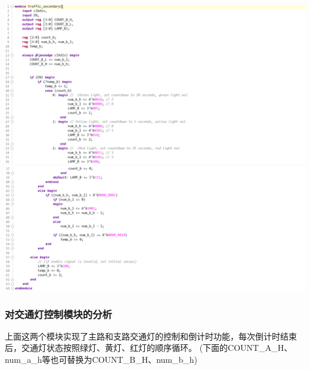 \documentclass[a4,10pt,zihao=-4]{ctexart}
\begin{document}
\vspace{1em}
\noindent\includegraphics[width=1\textwidth]{traffic_secondary_1_code.png}
\noindent\includegraphics[width=1\textwidth]{traffic_secondary_2_code.png}

\subsubsection{对交通灯控制模块的分析}
上面这两个模块实现了主路和支路交通灯的控制和倒计时功能，每次倒计时结束后，交通灯状态按照绿灯、黄灯、红灯的顺序循环。 (下面的COUNT\_A\_H、num\_a\_h等也可替换为COUNT\_B\_H、num\_b\_h)
\end{document}
